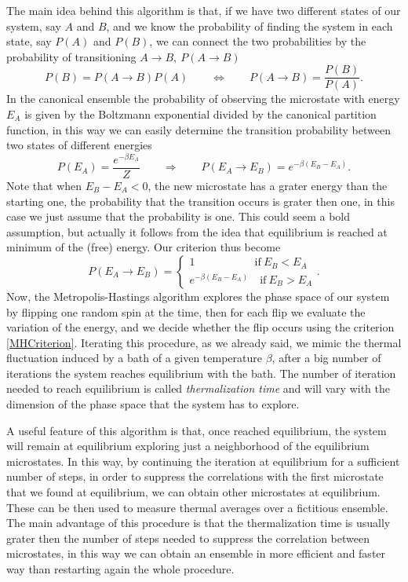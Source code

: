 The main idea behind this algorithm is that, if we have two different states of our system, say $A$ and $B$, and we know the probability of finding the system in each state, say $P(A)$ and $P(B)$, we can connect the two probabilities by the probability of transitioning $A\rightarrow B,\ P(A\rightarrow B)$
\begin{equation*}
    P(B)=P(A\rightarrow B)P(A)\qquad \Leftrightarrow\qquad P(A\rightarrow B)=\frac{P(B)}{P(A)}.
\end{equation*}
In the canonical ensemble the probability of observing the microstate with energy $E_A$ is given by the Boltzmann exponential divided by the canonical partition function, in this way we can easily determine the transition probability between two states of different energies
\begin{equation*}
    P(E_A)=\frac{e^{-\beta E_A}}{Z}\qquad \Rightarrow\qquad P(E_A\rightarrow E_B)=e^{-\beta(E_B-E_A)}.
\end{equation*} 
Note that when $E_B-E_A<0$, the new microstate has a grater energy than the starting one, the probability that the transition occurs is grater then one, in this case we just assume that the probability is one. This could seem a bold assumption, but actually it follows from the idea that equilibrium is reached at minimum of the (free) energy. Our criterion thus become
\begin{equation}
    \label{MHCriterion}
    P(E_A\rightarrow E_B)=\begin{cases}
        1\qquad\qquad\quad\ \  \text{if}\ E_B<E_A\\
        e^{-\beta(E_B-E_A)}\quad \text{if}\ E_B>E_A
    \end{cases}.
\end{equation}
Now, the Metropolis-Hastings algorithm explores the phase space of our system by flipping one random spin at the time, then for each flip we evaluate the variation of the energy, and we decide whether the flip occurs using the criterion \eqref{MHCriterion}. Iterating this procedure, as we already said, we mimic the thermal fluctuation induced by a bath of a given temperature $\beta$, after a big number of iterations the system reaches equilibrium with the bath. The number of iteration needed to reach equilibrium is called \emph{thermalization time} and will vary with the dimension of the phase space that the system has to explore.

A useful feature of this algorithm is that, once reached equilibrium, the system will remain at equilibrium exploring just a neighborhood of the equilibrium microstates. In this way, by continuing the iteration at equilibrium for a sufficient number of steps, in order to suppress the correlations with the first microstate that we found at equilibrium, we can obtain other microstates at equilibrium. These can be then used to measure thermal averages over a fictitious ensemble. The main advantage of this procedure is that the thermalization time is usually grater then the number of steps needed to suppress the correlation between microstates, in this way we can obtain an ensemble in more efficient and faster way than restarting again the whole procedure.

